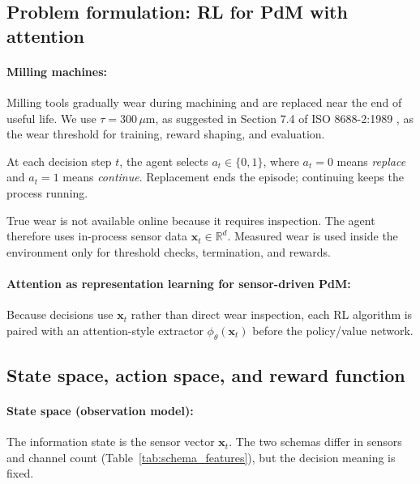 \documentclass[sn-basic]{sn-jnl}%
\begin{document}
\subsection{Problem formulation: RL for PdM with attention}
\label{sec:env} \label{app:env_reward}
\paragraph{Milling machines:}
Milling tools gradually wear during machining and are replaced near the end of useful life. We use $\tau = 300\,\mu\mathrm{m}$, as suggested in Section 7.4 of ISO 8688-2:1989 \citep{ISO8688-2-1989}, as the wear threshold for training, reward shaping, and evaluation.

At each decision step $t$, the agent selects $a_t\in\{0,1\}$, where $a_t=0$ means \emph{replace} and $a_t=1$ means \emph{continue}. Replacement ends the episode; continuing keeps the process running.

True wear is not available online because it requires inspection. The agent therefore uses in-process sensor data $\mathbf{x}_t\in\mathbb{R}^d$. Measured wear is used inside the environment only for threshold checks, termination, and rewards.

\paragraph{Attention as representation learning for sensor-driven PdM:}
Because decisions use $\mathbf{x}_t$ rather than direct wear inspection, each RL algorithm is paired with an attention-style extractor $\phi_\theta(\mathbf{x}_t)$ before the policy/value network.

\subsection{State space, action space, and reward function}
\label{sec:mdp_components}

\paragraph{State space (observation model):}
The information state is the sensor vector $\mathbf{x}_t$. The two schemas differ in sensors and channel count (Table~\ref{tab:schema_features}), but the decision meaning is fixed.
\end{document}
